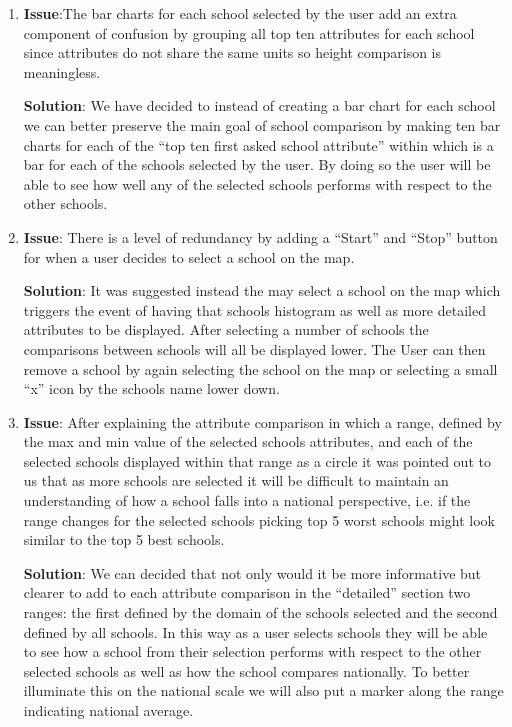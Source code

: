 \documentclass[11pt, a4paper]{article}
\begin{document}
\begin{enumerate}
\item \textbf{Issue}:The bar charts for each school selected by the user add an extra component of confusion by grouping all top ten attributes for each school since attributes do not share the same units so height comparison is meaningless.
  
  \textbf{Solution}: We have decided to instead of creating a bar chart for each school we can better preserve the main goal of school comparison by making ten bar charts for each of the ``top ten first asked school attribute'' within which is a bar for each of the schools selected by the user. By doing so the user will be able to see how well any of the selected schools performs with respect to the other schools.
\item \textbf{Issue}: There is a level of redundancy by adding a ``Start'' and ``Stop'' button for when a user decides to select a school on the map.

  \textbf{Solution}: It was suggested instead the may select a school on the map which triggers the event of having that schools histogram as well as more detailed attributes to be displayed. After selecting a number of schools the comparisons between schools will all be displayed lower. The User can then remove a school by again selecting the school on the map or selecting a small ``x'' icon by the schools name lower down.

\item \textbf{Issue}: After explaining the attribute comparison in which a range, defined by the max and min value of the selected schools attributes, and each of the selected schools displayed within that range as a circle it was pointed out to us that as more schools are selected it will be difficult to maintain an understanding of how a school falls into a national perspective, i.e. if the range changes for the selected schools picking top 5 worst schools might look similar to the top 5 best schools.

  \textbf{Solution}: We can decided that not only would it be more informative but clearer to add to each attribute comparison in the ``detailed'' section two ranges: the first defined by the domain of the schools selected and the second defined by all schools. In this way as a user selects schools they will be able to see how a school from their selection performs with respect to the other selected schools as well as how the school compares nationally. To better illuminate this on the national scale we will also put a marker along the range indicating national average.
  
  

\end{enumerate}
\end{document}
